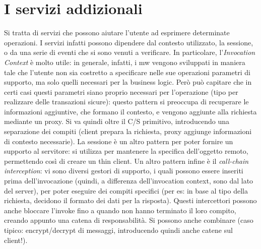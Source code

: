\section{I servizi addizionali}
Si tratta di servizi che possono aiutare l'utente ad esprimere determinate operazioni. I servizi infatti possono
dipendere dal contesto utilizzato, la sessione, o da una serie di eventi che si sono venuti a verificare.
In particolare, l'\textit{Invocation Context} è molto utile: in generale, infatti, i mw vengono sviluppati in maniera
tale che l'utente non sia costretto a specificare nelle sue operazioni parametri di supporto, ma solo quelli necessari
per la business logic. Però può capitare che in certi casi questi parametri siano proprio necessari per l'operazione
(tipo per realizzare delle transazioni sicure): questo pattern si preoccupa di recuperare le informazioni aggiuntive,
che formano il contesto, e vengono aggiunte alla richiesta mediante un proxy. Si va quindi oltre il C/S primitivo,
introducendo una separazione dei compiti (client prepara la richiesta, proxy aggiunge informazioni di contesto
necessarie). La sessione è un altro pattern per poter fornire un supporto al servitore: si utilizza per mantenere la
specifica dell'oggetto remoto, permettendo così di creare un thin client.
Un altro pattern infine è il \textit{call-chain interception}: vi sono diversi gestori di supporto, i quali possono
essere inseriti prima dell'invocazione (quindi, a differenza dell'invocation context, sono dal lato del server), per
poter eseguire dei compiti specifici (per es: in base al tipo della richiesta, decidono il formato dei dati per la
risposta). Questi intercettori possono anche bloccare l'invoke fino a quando non hanno terminato il loro compito,
creando appunto una catena di responsabilità. Si possono anche combinare (caso tipico: encrypt/decrypt di messaggi,
introducendo quindi anche catene sul client!).
